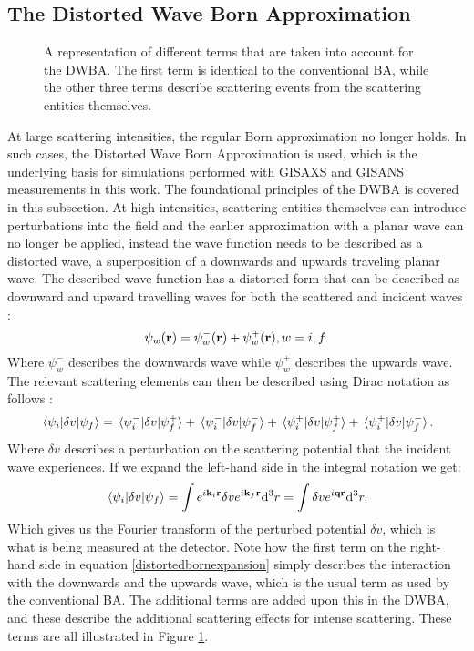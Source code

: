 \subsection{The Distorted Wave Born Approximation}\label{DWBA_section}
\begin{figure}[b]
	\centering
	\def\svgwidth{\textwidth}
	
	\caption{A representation of different terms that are taken into account for the DWBA. The first term is identical to the conventional BA, while the other three terms describe scattering events from the scattering entities themselves.}
	\label{dwba_terms}
\end{figure}
At large scattering intensities, the regular Born approximation no longer holds. In such cases, the Distorted Wave Born Approximation is used, which is the underlying basis for simulations performed with GISAXS and GISANS measurements in this work. The foundational principles of the DWBA is covered in this subsection. At high intensities, scattering entities themselves can introduce perturbations into the field and the earlier approximation with a planar wave can no longer be applied, instead the wave function needs to be described as a distorted wave, a superposition of a downwards and upwards traveling planar wave. The described wave function has a distorted form that can be described as downward and upward travelling waves for both the scattered and incident waves \cite{BornAgainManual}:
\begin{equation}
	\psi_w(\vb{r}) = \psi_w^-(\vb{r}) + \psi_w^+(\vb{r}), w = i, f.
\end{equation}
Where $\psi_w^-$ describes the downwards wave while $\psi_w^+$ describes the upwards wave. The relevant scattering elements can then be described using Dirac notation as follows \cite{BornAgainManual}:
\begin{equation}\label{distortedbornexpansion}
	\mel{\psi_i}{\delta v}{\psi_f} = \mel*{\psi_i^-}{\delta v}{\psi_f^+} + \mel*{\psi_i^-}{\delta v}{\psi_f^-} + \mel*{\psi_i^+}{\delta v}{\psi_f^+} + \mel*{\psi_i^+}{\delta v}{\psi_f^-}.
\end{equation} 
Where $\delta v$ describes a perturbation on the scattering potential that the incident wave experiences. If we expand the left-hand side in the integral notation we get:
\begin{equation}
	\mel{\psi_i}{\delta v}{\psi_f} = \int e^{i\vb{k}_i\vb{r}}\delta v e^{i\vb{k}_f\vb{r}}\dd^3 r = \int \delta v e^{i\vb{q}\vb{r}}\dd^3 r.
\end{equation}
Which gives us the Fourier transform of the perturbed potential $\delta v$, which is what is being measured at the detector. Note how the first term on the right-hand side in equation \ref{distortedbornexpansion} simply describes the interaction with the downwards and the upwards wave, which is the usual term as used by the conventional BA. The additional terms are added upon this in the DWBA, and these describe the additional scattering effects for intense scattering. These terms are all illustrated in Figure \ref{dwba_terms}.


